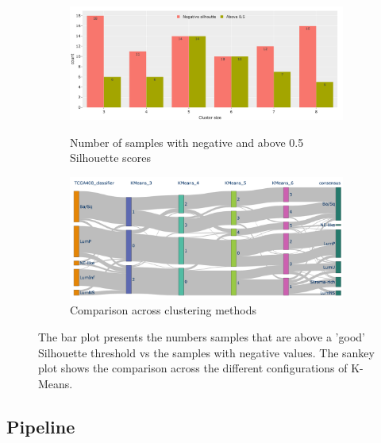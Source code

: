 \begin{figure}[H]
    \centering
    \begin{subfigure}[H]{0.8\textwidth}
        \includegraphics[width=\textwidth, keepaspectratio]{Sections/ClusteringAnalysis/Resources/cs_top3/sill_distrib/sill_neg_above_th.png}
        \label{fig:cs:sill_neg_above_th}
        \caption{Number of samples with negative and above 0.5 Silhouette scores}
    \end{subfigure}
    \centering
     \begin{subfigure}[!t]{0.8\textwidth}
        \includegraphics[width=\textwidth, keepaspectratio]{Sections/ClusteringAnalysis/Resources/cs_top3/sill_distrib/sky_kMeans.png}
        \caption{Comparison across clustering methods}
    \end{subfigure}
    \centering
    \caption{The bar plot presents the numbers samples that are above a 'good' Silhouette threshold vs the samples with negative values. The sankey plot shows the comparison across the different configurations of K-Means.}
    \label{fig:cs:sankey_comp}
\end{figure}



\subsection{Pipeline}

